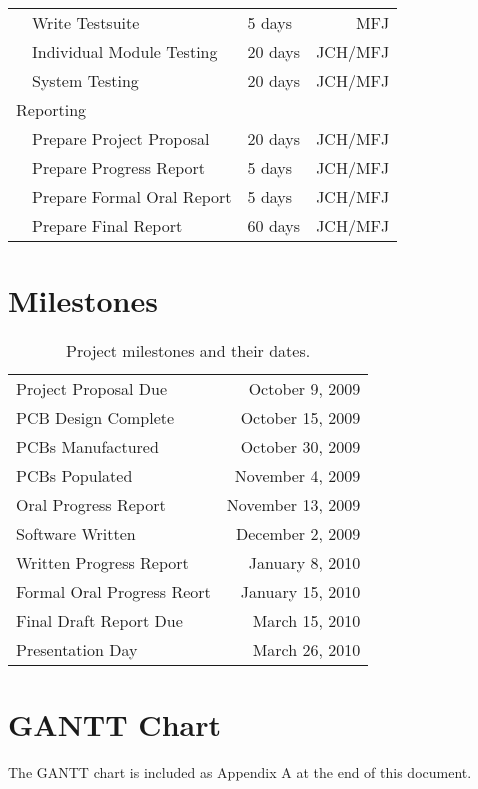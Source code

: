 \begin{table}[H]
\begin{tabular}{|l|l|l|r|}
  \hline 
  & Write Testsuite & 5 days & MFJ\\
  & Individual Module Testing & 20 days & JCH/MFJ\\
  & System Testing & 20 days & JCH/MFJ\\
  \hline
  \multicolumn{3}{|l|}{Reporting} &\\
  \hline
  & Prepare Project Proposal & 20 days & JCH/MFJ\\
  & Prepare Progress Report & 5 days & JCH/MFJ\\
  & Prepare Formal Oral Report & 5 days & JCH/MFJ\\
  & Prepare Final Report & 60 days & JCH/MFJ\\
  \hline
  \end{tabular}
\end{table}

\section{Milestones}

\begin{table}[H]
  \caption{Project milestones and their dates.}
  \label{table:milestones}
  \centering
  \begin{tabular}{|l|r|}
    \hline
    Project Proposal Due & October 9, 2009\\
    PCB Design Complete & October 15, 2009\\
    PCBs Manufactured & October 30, 2009\\
    PCBs Populated & November 4, 2009\\
    Oral Progress Report & November 13, 2009\\
    Software Written & December 2, 2009\\
    Written Progress Report & January 8, 2010\\
    Formal Oral Progress Reort & January 15, 2010\\
    Final Draft Report Due & March 15, 2010\\
    Presentation Day & March 26, 2010\\
    \hline
  \end{tabular}
\end{table}

\section{GANTT Chart}

The GANTT chart is included as Appendix A at the end of this document.

